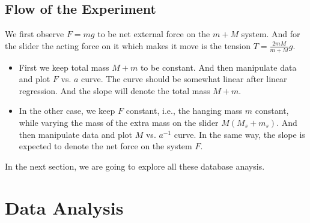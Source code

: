 \documentclass[11pt, a4paper, abstract=true]{scrartcl}
\begin{document}
\subsection{Flow of the Experiment}
We first observe \(F = mg\) to be net external force on the \(m+M\) system. And for the slider the acting force on it which makes it move is the tension \(T = \frac{2mM}{m + M} g\).
\begin{itemize}
    \item First we keep total mass \(M+m\) to be constant. And then manipulate data and plot \(F\) vs. \(a\) curve. The curve should be somewhat linear after linear regression. And the slope will denote the total mass \(M+m\).
    \item In the other case, we keep \(F\) constant, i.e., the hanging mass \(m\) constant, while varying the mass of the extra mass on the slider \(M (M_s+m_s)\). And then manipulate data and plot \(M\) vs. \(a^{-1}\) curve. In the same way, the slope is expected to denote the net force on the system \(F\).
\end{itemize}
In the next section, we are going to explore all these database anaysis.
\newpage
\section{Data Analysis}
\end{document}
